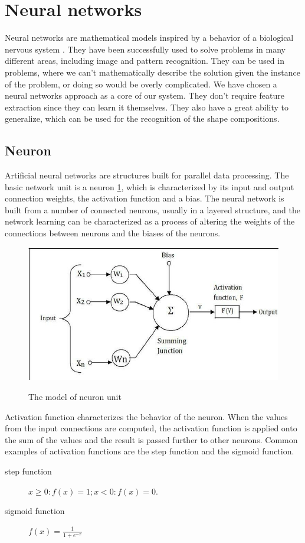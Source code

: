 \section{Neural networks}
Neural networks are mathematical models inspired by a behavior of a biological nervous system \cite{bishop}. They have been successfully used to solve problems in many different areas, including image and pattern recognition. They can be used in problems, where we can't mathematically describe the solution given the instance of the problem, or doing so would be overly complicated. We have chosen a neural networks approach as a core of our system. They don't require feature extraction since they can learn it themselves. They also have a great ability to generalize, which can be used for the recognition of the shape compositions.

\subsection{Neuron}
Artificial neural networks are structures built for parallel data processing. The basic network unit is a neuron \ref{fig:neuron}, which is characterized by its input and output connection weights, the activation function and a bias. The neural network is built from a number of connected neurons, usually in a layered structure, and the network learning can be characterized as a process of altering the weights of the connections between neurons and the biases of the neurons.

\begin{figure}
\centering
\includegraphics[width=.5\linewidth]{ext/neuron.png}
\label{fig:neuron}
\caption{The model of neuron unit}
\end{figure}

Activation function characterizes the behavior of the neuron. When the values from the input connections are computed, the activation function is applied onto the sum of the values and the result is passed further to other neurons. Common examples of activation functions are the step function and the sigmoid function.

\begin{description}
	\item [step function] $ x \geq 0: f(x) = 1; x < 0: f(x) = 0. $
	\item [sigmoid function] $ f(x) = \frac{1}{1+e^{-x}} $
\end{description}

